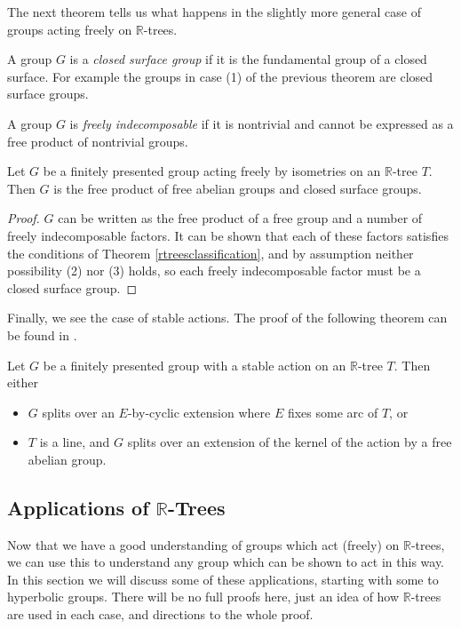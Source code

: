 The next theorem tells us what happens in the slightly more general case of groups acting freely on $\mathbb{R}$-trees. 
\begin{definition}
    A group $G$ is a \emph{closed surface group} if it is the fundamental group of a closed surface. For example the groups in case (1) of the previous theorem are closed surface groups.
\end{definition}
\begin{definition}
    A group $G$ is \emph{freely indecomposable} if it is nontrivial and cannot be expressed as a free product of nontrivial groups.
\end{definition}

\begin{theorem}
    Let $G$ be a finitely presented group acting freely by isometries on an $\mathbb{R}$-tree $T$. Then $G$ is the free product of free abelian groups and closed surface groups.
\end{theorem}
\begin{proof}
    $G$ can be written as the free product of a free group and a number of freely indecomposable factors. It can be shown that each of these factors satisfies the conditions of Theorem \ref{rtreesclassification}, and by assumption neither possibility (2) nor (3) holds, so each freely indecomposable factor must be a closed surface group. 
\end{proof}

Finally, we see the case of stable actions. The proof of the following theorem can be found in \cite{Bestvina2}.

\begin{theorem}\label{stable}
    Let $G$ be a finitely presented group with a stable action on an $\mathbb{R}$-tree $T$. Then either
    \begin{itemize}
        \item $G$ splits over an $E$-by-cyclic extension where $E$ fixes some arc of $T$, or
        \item $T$ is a line, and $G$ splits over an extension of the kernel of the action by a free abelian group.
    \end{itemize}
\end{theorem}

\subsection{Applications of $\mathbb{R}$-Trees}
Now that we have a good understanding of groups which act (freely) on $\mathbb{R}$-trees, we can use this to understand any group which can be shown to act in this way. In this section we will discuss some of these applications, starting with some to hyperbolic groups. There will be no full proofs here, just an idea of how $\mathbb{R}$-trees are used in each case, and directions to the whole proof.
